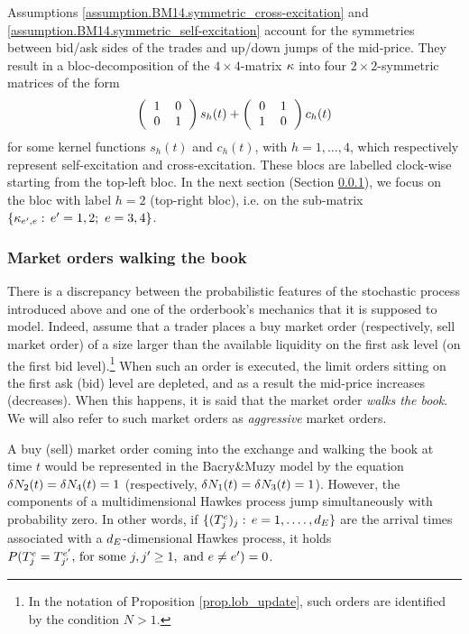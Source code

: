 \documentclass[10pt]{article}
\begin{document}
Assumptions \ref{assumption.BM14.symmetric_cross-excitation} and \ref{assumption.BM14.symmetric_self-excitation} account for the symmetries between bid/ask sides of the trades and up/down jumps of the mid-price. They result in a bloc-decomposition of the $4\times4$-matrix $\hawkesKernel$ into four $2\times2$-symmetric matrices of the form
\begin{equation*}
 \left(
 \begin{tabular}{cc}
  1 & 0 \\ 0 & 1
 \end{tabular}
 \right)s_h(t)
 +
 \left(
 \begin{tabular}{cc}
  0 & 1 \\ 1 & 0
 \end{tabular}
\right) c_h(t)
\end{equation*}
for some kernel functions $s_h(t)$ and $c_h(t)$, with $h=1,\dots,4$, which respectively represent self-excitation and cross-excitation. These blocs are labelled clock-wise starting from the top-left bloc. In the next section (Section \ref{sec.BM14_walking_the_book}), we focus on the bloc with label $h=2$ (top-right bloc), i.e. on the sub-matrix $\lbrace \hawkesKernel_{\eone,e}: \, \eone =1,2; \, \, e=3,4 \rbrace$.
\subsubsection{Market orders walking the book}\label{sec.BM14_walking_the_book}
There is a discrepancy between the probabilistic features of the stochastic process introduced above and one of the orderbook's mechanics that it is supposed to model. Indeed, assume that a trader places a buy market order (respectively,  sell market order) of a size larger than the available liquidity on the first ask level (on the first bid level).\footnote{In the notation of Proposition \ref{prop.lob_update}, such orders are identified by the condition $N>1$.} When such an order is executed, the limit orders sitting on the first ask (bid) level are depleted, and as a result the mid-price increases (decreases). When this happens, it is said that the market order \emph{walks the book}. We will also refer to such market orders as \emph{aggressive} market orders. 

A buy (sell) market order coming into the exchange and walking the book at time $t$ would be represented in the Bacry\&Muzy model by the equation $\delta\countingProc[2](t) = \delta\countingProc[4](t) = 1$ (respectively, $\delta\countingProc[1](t) = \delta\countingProc[3](t) = 1$). However, the components of a multidimensional Hawkes process jump simultaneously with probability zero. In other words, if $\lbrace (\arrivalTimes[e]_j)_j: \, e=1,.\dots,\numEventTypes\rbrace$ are the arrival times associated with a $\numEventTypes$-dimensional Hawkes process, it holds $\Prob(\arrivalTimes[e]_j = \arrivalTimes[\eone]_{j\derivative}, \, \text{for some } j,j\derivative\geq 1, \text{ and } e\ne\eone) = 0$.
\end{document}
